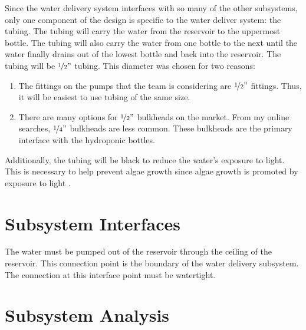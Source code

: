 \documentclass[12pt]{article}
\begin{document}
Since the water delivery system interfaces with so many of the other subsystems, only one component
of the design is specific to the water deliver system: the tubing. The tubing will carry the water
from the reservoir to the uppermost bottle. The tubing will also carry the water from one bottle to
the next until the water finally drains out of the lowest bottle and back into the reservoir. The
tubing will be $\nicefrac{1}{2}"$ tubing. This diameter was chosen for two reasons:

\begin{enumerate}

    \item The fittings on the pumps that the team is considering are $\nicefrac{1}{2}"$ fittings.
        Thus, it will be easiest to use tubing of the same size.

    \item There are many options for $\nicefrac{1}{2}"$ bulkheads on the market. From my online
        searches, $\nicefrac{1}{4}"$ bulkheads are less common. These bulkheads are the primary
        interface with the hydroponic bottles.

\end{enumerate}

Additionally, the tubing will be black to reduce the water's exposure to light. This is necessary to
help prevent algae growth since algae growth is promoted by exposure to light \cite{doe-washington}.

\section{Subsystem Interfaces}


The water must be pumped out of the reservoir through the ceiling of the reservoir. This connection
point is the boundary of the water delivery subsystem. The connection at this interface point must
be watertight.



\section{Subsystem Analysis}

\end{document}
